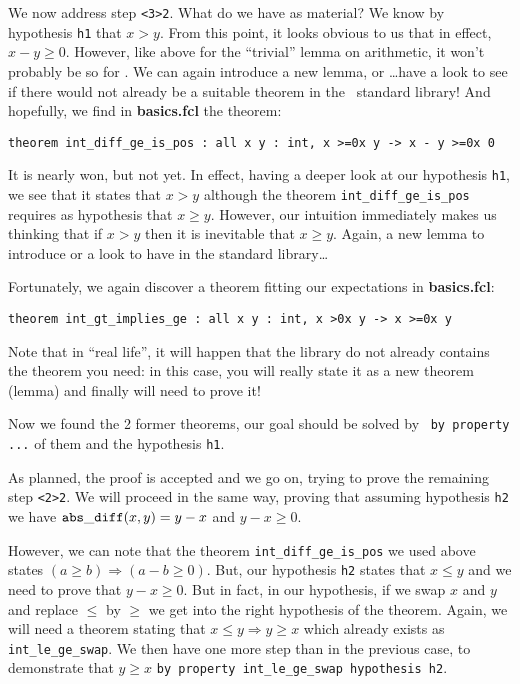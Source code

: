 \documentclass[11pt,a4paper,twoside,onecolumn,fullpage]{article}
\begin{document}
We now address step \lstinline"<3>2".  What do we have as material? We
know by hypothesis \lstinline"h1" that $x>y$. From this point, it looks
obvious to us that in effect,  $x - y \ge 0$. However, like above for
the ``trivial'' lemma on arithmetic, it won't probably be so for
\zenon. We can again introduce a new lemma, or \ldots have a look to
see if there would not already be a suitable theorem in the \focal\
standard library! And hopefully, we find in \textbf{basics.fcl} the
theorem:

{\scriptsize
\begin{lstlisting}
theorem int_diff_ge_is_pos : all x y : int, x >=0x y -> x - y >=0x 0
\end{lstlisting}}

It is nearly won, but not yet. In effect, having a deeper look at our
hypothesis \lstinline"h1", we see that it states that $x > y$ although
the theorem \lstinline"int_diff_ge_is_pos" requires as hypothesis that
$x \ge y$. However, our intuition immediately makes us thinking that if
$x > y$ then it is inevitable that $x \ge y$. Again, a new lemma to
introduce or a look to have in the standard library\ldots

Fortunately, we again discover a theorem fitting our expectations in
\textbf{basics.fcl}:

{\scriptsize
\begin{lstlisting}
theorem int_gt_implies_ge : all x y : int, x >0x y -> x >=0x y
\end{lstlisting}}

Note that in ``real life'', it will happen that the library do not already
contains the theorem you need: in this case, you will really state it
as a new theorem (lemma) and finally will need to prove it!

Now we found the 2 former theorems, our goal should be solved by
\zenon\ \lstinline"by property ..." of them and the hypothesis
\lstinline"h1".

{\scriptsize
}

As planned, the proof is accepted and we go on, trying to prove the
remaining step \lstinline"<2>2". We will proceed in the same way,
proving that assuming hypothesis \lstinline"h2" we have
${\tt abs\_diff} (x, y) = y - x$ and $y - x \ge 0$.

However, we can note that the theorem \lstinline"int_diff_ge_is_pos"
we used above states  $(a \ge b) \Rightarrow (a - b \ge 0)$.
But, our hypothesis \lstinline"h2" states that $x \le y$ and we need
to prove that $y -x \ge 0$. But in fact, in our hypothesis, if we swap $x$ and
$y$ and replace $\le$ by $\ge$ we get into the right hypothesis of the
theorem. Again, we will need a theorem stating that
$x \le y \Rightarrow y \ge x$ which already exists as
\lstinline"int_le_ge_swap". We then have one more step than in the
previous case, to demonstrate that $y \ge x$
\lstinline"by property int_le_ge_swap hypothesis h2".
\end{document}
